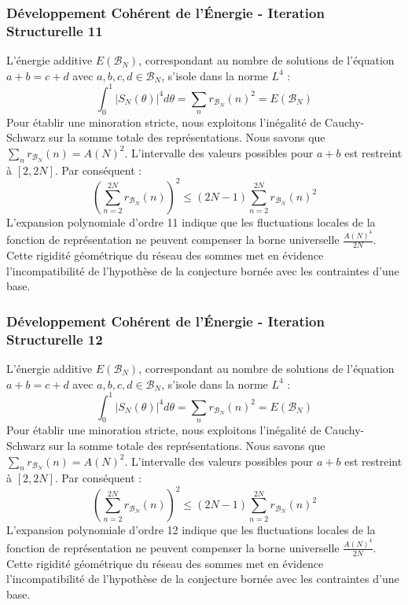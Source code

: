 \documentclass[11pt,a4paper]{article}
\begin{document}
\subsubsection{Développement Cohérent de l'Énergie - Iteration Structurelle 11}
L'énergie additive $E(\mathcal{B}_N)$, correspondant au nombre de solutions de l'équation $a+b = c+d$ avec $a,b,c,d \in \mathcal{B}_N$, s'isole dans la norme $L^4$ :
$$ \int_{0}^{1} |S_N(\theta)|^4 d\theta = \sum_{n} r_{\mathcal{B}_N}(n)^2 = E(\mathcal{B}_N) $$
Pour établir une minoration stricte, nous exploitons l'inégalité de Cauchy-Schwarz sur la somme totale des représentations. Nous savons que $\sum_{n} r_{\mathcal{B}_N}(n) = A(N)^2$. L'intervalle des valeurs possibles pour $a+b$ est restreint à $[2, 2N]$.
Par conséquent :
$$ \left( \sum_{n=2}^{2N} r_{\mathcal{B}_N}(n) \right)^2 \leq (2N - 1) \sum_{n=2}^{2N} r_{\mathcal{B}_N}(n)^2 $$
L'expansion polynomiale d'ordre 11 indique que les fluctuations locales de la fonction de représentation ne peuvent compenser la borne universelle $\frac{A(N)^4}{2N}$. Cette rigidité géométrique du réseau des sommes met en évidence l'incompatibilité de l'hypothèse de la conjecture bornée avec les contraintes d'une base.
\subsubsection{Développement Cohérent de l'Énergie - Iteration Structurelle 12}
L'énergie additive $E(\mathcal{B}_N)$, correspondant au nombre de solutions de l'équation $a+b = c+d$ avec $a,b,c,d \in \mathcal{B}_N$, s'isole dans la norme $L^4$ :
$$ \int_{0}^{1} |S_N(\theta)|^4 d\theta = \sum_{n} r_{\mathcal{B}_N}(n)^2 = E(\mathcal{B}_N) $$
Pour établir une minoration stricte, nous exploitons l'inégalité de Cauchy-Schwarz sur la somme totale des représentations. Nous savons que $\sum_{n} r_{\mathcal{B}_N}(n) = A(N)^2$. L'intervalle des valeurs possibles pour $a+b$ est restreint à $[2, 2N]$.
Par conséquent :
$$ \left( \sum_{n=2}^{2N} r_{\mathcal{B}_N}(n) \right)^2 \leq (2N - 1) \sum_{n=2}^{2N} r_{\mathcal{B}_N}(n)^2 $$
L'expansion polynomiale d'ordre 12 indique que les fluctuations locales de la fonction de représentation ne peuvent compenser la borne universelle $\frac{A(N)^4}{2N}$. Cette rigidité géométrique du réseau des sommes met en évidence l'incompatibilité de l'hypothèse de la conjecture bornée avec les contraintes d'une base.
\end{document}
